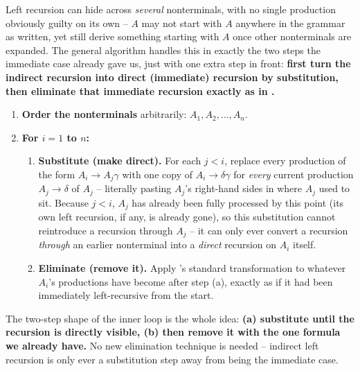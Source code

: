 \documentclass[full-course-notes.tex]{subfiles}
\begin{document}
\dbtag Left recursion can hide across \emph{several} nonterminals, with no single production
obviously guilty on its own -- $A$ may not start with $A$ anywhere in the grammar as written,
yet still derive something starting with $A$ once other nonterminals are expanded. The general
algorithm handles this in exactly the two steps the immediate case already gave us, just with
one extra step in front: \textbf{first turn the indirect recursion into direct (immediate)
recursion by substitution, then eliminate that immediate recursion exactly as in
.}

\begin{coreidea}
\begin{enumerate}
  \item \textbf{Order the nonterminals} arbitrarily: $A_1, A_2, \dots, A_n$.
  \item \textbf{For $i = 1$ to $n$:}
  \begin{enumerate}[label=(\alph*)]
    \item \textbf{Substitute (make direct).} For each $j < i$, replace every production of the
    form $A_i \to A_j\gamma$ with one copy of $A_i \to \delta\gamma$ for \emph{every} current
    production $A_j \to \delta$ of $A_j$ -- literally pasting $A_j$'s right-hand sides in where
    $A_j$ used to sit. Because $j < i$, $A_j$ has already been fully processed by this point
    (its own left recursion, if any, is already gone), so this substitution cannot reintroduce
    a recursion through $A_j$ -- it can only ever convert a recursion \emph{through} an earlier
    nonterminal into a \emph{direct} recursion on $A_i$ itself.
    \item \textbf{Eliminate (remove it).} Apply
    's standard transformation to whatever $A_i$'s
    productions have become after step (a), exactly as if it had been immediately
    left-recursive from the start.
  \end{enumerate}
\end{enumerate}
The two-step shape of the inner loop is the whole idea: \textbf{(a) substitute until the
recursion is directly visible, (b) then remove it with the one formula we already have.} No new
elimination technique is needed -- indirect left recursion is only ever a substitution step
away from being the immediate case.
\end{coreidea}
\end{document}
